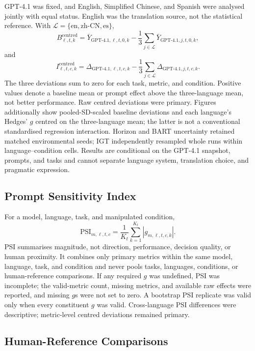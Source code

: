 \documentclass[logo,msc]{infthesis}
\begin{document}
GPT-4.1 was fixed, and English, Simplified Chinese, and Spanish were analysed jointly with equal status. English was the translation source, not the statistical reference. With $\mathcal L=\{\mathrm{en},\mathrm{zh\mbox{-}CN},\mathrm{es}\}$,
\[
B^{\mathrm{centred}}_{\ell,t,k}=\bar Y_{\mathrm{GPT\mbox{-}4.1},\ell,t,0,k}-\frac13\sum_{j\in\mathcal L}\bar Y_{\mathrm{GPT\mbox{-}4.1},j,t,0,k},
\]
and
\[
I^{\mathrm{centred}}_{\ell,t,c,k}=\Delta_{\mathrm{GPT\mbox{-}4.1},\ell,t,c,k}-\frac13\sum_{j\in\mathcal L}\Delta_{\mathrm{GPT\mbox{-}4.1},j,t,c,k}.
\]
The three deviations sum to zero for each task, metric, and condition. Positive values denote a baseline mean or prompt effect above the three-language mean, not better performance. Raw centred deviations were primary. Figures additionally show pooled-SD-scaled baseline deviations and each language's Hedges' $g$ centred on the three-language mean; the latter is not a conventional standardised regression interaction. Horizon and BART uncertainty retained matched environmental seeds; IGT independently resampled whole runs within language--condition cells. Results are conditional on the GPT-4.1 snapshot, prompts, and tasks and cannot separate language system, translation choice, and pragmatic expression.

\subsection{Prompt Sensitivity Index}

For a model, language, task, and manipulated condition,
\[
\mathrm{PSI}_{m,\ell,t,c}=\frac{1}{K_t}\sum_{k=1}^{K_t}|g_{m,\ell,t,c,k}|.
\]
PSI summarises magnitude, not direction, performance, decision quality, or human proximity. It combines only primary metrics within the same model, language, task, and condition and never pools tasks, languages, conditions, or human-reference comparisons. If any required $g$ was undefined, PSI was incomplete; the valid-metric count, missing metrics, and available raw effects were reported, and missing $g$s were not set to zero. A bootstrap PSI replicate was valid only when every constituent $g$ was valid. Cross-language PSI differences were descriptive; metric-level centred deviations remained primary.

\subsection{Human-Reference Comparisons}
\end{document}
